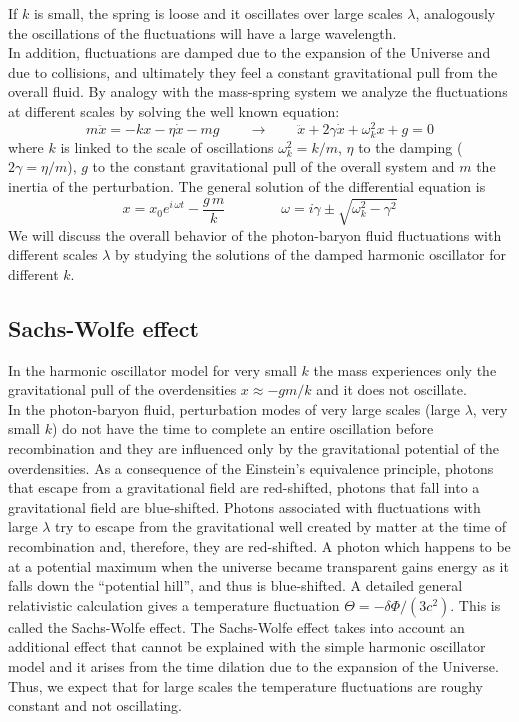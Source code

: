 \documentclass{article}
\begin{document}
If $k$ is small, the spring is loose and it  oscillates over large scales $\lambda$, analogously the oscillations of the fluctuations will have a large wavelength. \\ 
In addition, fluctuations are damped due to the expansion of the Universe and due to collisions, and ultimately they feel a constant gravitational pull from the overall fluid.
By analogy with the mass-spring system we analyze the fluctuations at different scales by solving the well known equation:
\begin{equation}
m\ddot{x} = - k x - \eta \dot{x} - m g \qquad \rightarrow \qquad \ddot{x} + 2 \gamma \dot{x} + \omega_k ^2 x + g =0
\end{equation}
where $k$ is linked to the scale of oscillations $\omega_k ^2 = k/m$, $\eta$ to the damping ($2 \gamma = \eta /m$), $g$ to the constant gravitational pull of the overall system and $m$ the inertia of the perturbation.
The general solution of the differential equation is 
\begin{equation}
x = x_0 e^{i \, \omega t} - \dfrac{g \, m}{k} \qquad \qquad \omega = i \gamma \pm \sqrt{ \omega_k ^2 - \gamma^2}
\end{equation}
We will discuss the overall behavior of the photon-baryon fluid fluctuations with different scales $\lambda$ by studying the solutions of the damped harmonic oscillator for different $k$.


\subsection{Sachs-Wolfe effect}
In the harmonic oscillator model for very small $k$ the mass experiences only the gravitational pull of the overdensities $x \approx - g m/k$ and it does not oscillate.\\
In the photon-baryon fluid, perturbation modes of very large scales (large $\lambda$, very small $k$) do not have the time to complete an entire oscillation before recombination and they are influenced only by the gravitational potential of the overdensities.
As a consequence of the Einstein's equivalence principle, photons that escape from a gravitational field are red-shifted, photons that fall into a gravitational field are blue-shifted.
Photons associated with fluctuations with large $\lambda$ try to escape from the gravitational well created by matter at the time of recombination and, therefore, they are red-shifted.
A photon which happens to be at a potential maximum when the universe became transparent gains energy as it falls down the “potential hill”, and thus is blue-shifted.
A detailed general relativistic calculation gives a temperature fluctuation $\Theta = -\delta \Phi /(3c^2)$.
This is called the Sachs-Wolfe effect.
The Sachs-Wolfe effect takes into account an additional effect that cannot be explained with the simple harmonic oscillator model and it arises from the time dilation due to the expansion of the Universe.\\
Thus, we expect that for large scales the temperature fluctuations are roughy constant and not oscillating.
%
%
%
\end{document}
